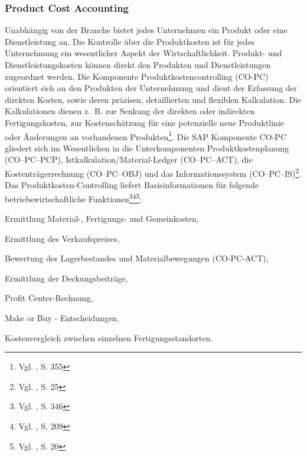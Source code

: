 \subsubsection{Product Cost Accounting}
Unabhängig von der Branche bietet jedes Unternehmen ein Produkt oder eine Dienstleistung an. Die Kontrolle über die Produktkosten ist für jedes Unternehmung ein wesentlicher Aspekt der Wirtschaftlichkeit. Produkt- und Dienstleistungskosten können direkt den Produkten und Dienstleistungen zugeordnet werden. Die Komponente Produktkostencontrolling (CO-PC) orientiert sich an den Produkten der Unternehmung und dient der Erfassung der direkten Kosten, sowie deren präzisen, detaillierten und flexiblen Kalkulation. Die Kalkulationen dienen z.~B. zur Senkung der direkten oder indirekten Fertigungskosten, zur Kostenschätzung für eine potenzielle neue Produktlinie oder Änderungen an vorhandenen Produkten\footnote{Vgl. \cite{Patel2009}, S. 355}.
Die SAP Komponente CO-PC gliedert sich im Wesentlichen in die Unterkomponenten Produktkostenplanung (CO--PC--PCP), Istkalkulation/Material-Ledger (CO--PC--ACT), die Kostenträgerrechnung (CO--PC--OBJ) und das Informationssystem (CO--PC--IS)\footnote{Vgl. \cite{Friedl2008}, S. 25}.
Das Produktkosten-Controlling liefert Basisinformationen für folgende betriebswirtschaftliche Funktionen\footnote{Vgl. \cite{Maassen2006}, S. 346}\footnote{Vgl. \cite{Klein2010}, S. 209}\footnote{Vgl. \cite{SAPCOPCPCP2001}, S. 20}:
\begin{compactitem}
\item  Ermittlung Material-, Fertigungs- und Gemeinkosten,
\item  Ermittlung des Verkaufspreises,
\item  Bewertung des Lagerbestandes und Materialbewegungen (CO-PC-ACT), 
\item  Ermittlung der Deckungsbeiträge,
\item Profit Center-Rechnung,
\item Make or Buy - Entscheidungen,
\item Kostenvergleich zwischen einzelnen Fertigungsstandorten.
\end{compactitem}
